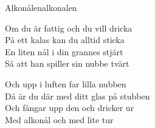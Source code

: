 \begin{song}{Alkonålen}{alkonalen}
\begin{vers}
Om du är fattig och du vill dricka\\
På ett kalas kan du alltid sticka\\
En liten nål i din grannes stjärt\\
Så att han spiller sin nubbe tvärt\\
\end{vers}
\begin{vers}
Och upp i luften far lilla nubben\\
Då är du där med ditt glas på stubben\\
Och fångar upp den och dricker ur\\
Med alkonål och med lite tur\\
\end{vers}
\end{song}
